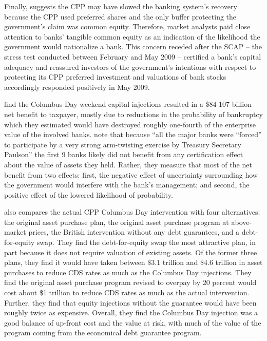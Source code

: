 \documentclass[12pt]{article}
\begin{document}
Finally, \citet{Ba} suggests the CPP may have slowed the banking system's recovery because the CPP used preferred shares and the only buffer protecting the government's claim was common equity. Therefore, market analysts paid close attention to banks' tangible common equity as an indication of the likelihood the government would nationalize a bank. This concern receded after the SCAP -- the stress test conducted between February and May 2009 -- certified a bank's capital adequacy and reassured investors of the government's intentions with respect to protecting its CPP preferred investment and valuations of bank stocks accordingly responded positively in May 2009.

\citet{Gift} find the Columbus Day weekend capital injections resulted in a \$84-107 billion net benefit to taxpayer, mostly due to reductions in the probability of bankruptcy which they estimated would have destroyed roughly one-fourth of the enterprise value of the involved banks. \citet{Gift} note that because ``all the major banks were ``forced'' to participate by a very strong arm-twisting exercise by Treasury Secretary Paulson'' the first 9 banks likely did not benefit from any certification effect about the value of assets they held. Rather, they measure that most of the net benefit from two effects: first, the negative effect of uncertainty surrounding how the government would interfere with the bank's management; and second, the positive effect of the lowered likelihood of probability.

\citet{Gift} also compares the actual CPP Columbus Day intervention with four alternatives: the original asset purchase plan, the original asset purchase program at above-market prices, the British intervention without any debt guarantees, and a debt-for-equity swap. They find the debt-for-equity swap the most attractive plan, in part because it does not require valuation of existing assets. Of the former three plans, they find it would have taken between \$3.1 trillion and \$4.6 trillion in asset purchases to reduce CDS rates as much as the Columbus Day injections. They find the original asset purchase program revised to overpay by 20 percent would cost about \$1 trillion to reduce CDS rates as much as the actual intervention. Further, they find that equity injections without the guarantee would have been roughly twice as expensive. Overall, they find the Columbus Day injection was a good balance of up-front cost and the value at risk, with much of the value of the program coming from the economical debt guarantee program.
\end{document}

